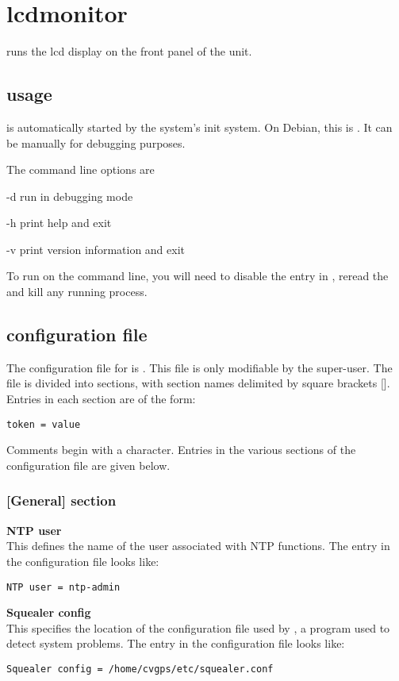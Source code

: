 \section{lcdmonitor}

 runs the lcd display on the front panel of the  unit.

\subsection{usage}
 is automatically started by the system's init system.
On Debian, this is . It can be manually for debugging purposes.

The command line options are
\begin{description*}
	\item[-d]	run in debugging mode
	\item[-h]	print help and exit
	\item[-v]	print version information and exit
\end{description*}
To run  on the command line, you will need to disable the entry in ,
reread the  and kill any running  process.

\subsection{configuration file \label{confformat}}

The configuration file for  is . This file is
only modifiable by the super-user. The file is divided into
sections, with section names delimited by square brackets [\space]. Entries in each section
are of the form:
\begin{lstlisting}
token = value
\end{lstlisting}
Comments begin with a \cc{\#} character. Entries in the various sections of the configuration file
are given below. 

\subsubsection{[General] section}

{\bfseries NTP user}\\
This  defines the name of the user associated with NTP functions.
The entry in the configuration file looks like:
\begin{lstlisting}
NTP user = ntp-admin
\end{lstlisting}
{\bfseries Squealer config}\\
This  specifies the location of the configuration file used by , a
program used to detect system problems.
The entry in the configuration file looks like:
\begin{lstlisting}
Squealer config = /home/cvgps/etc/squealer.conf
\end{lstlisting}

